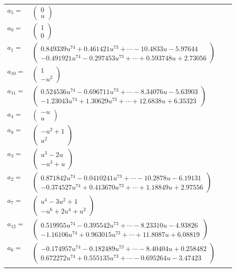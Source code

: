 \documentclass[1p]{elsarticle_modified}
\theoremstyle{definition}
\begin{document}
\begin{tabular}{m{7pt} m{180pt} m{7pt} m{180pt} }
\flushright $a_{5}=$&$\begin{pmatrix}0\\u\end{pmatrix}$ \\
\flushright $a_{9}=$&$\begin{pmatrix}1\\0\end{pmatrix}$ \\
\flushright $a_{1}=$&$\begin{pmatrix}0.849339 u^{74}+0.461421 u^{73}+\cdots-10.4833 u-5.97644\\-0.491921 u^{74}-0.297453 u^{73}+\cdots+0.593748 u+2.73056\end{pmatrix}$ \\
\flushright $a_{10}=$&$\begin{pmatrix}1\\- u^2\end{pmatrix}$ \\
\flushright $a_{11}=$&$\begin{pmatrix}0.524536 u^{74}-0.696711 u^{73}+\cdots-8.34076 u-5.63903\\-1.23043 u^{74}+1.30629 u^{73}+\cdots+12.6838 u+6.35323\end{pmatrix}$ \\
\flushright $a_{4}=$&$\begin{pmatrix}- u\\u\end{pmatrix}$ \\
\flushright $a_{8}=$&$\begin{pmatrix}- u^2+1\\u^2\end{pmatrix}$ \\
\flushright $a_{3}=$&$\begin{pmatrix}u^3-2 u\\- u^3+u\end{pmatrix}$ \\
\flushright $a_{2}=$&$\begin{pmatrix}0.871842 u^{74}-0.0410241 u^{73}+\cdots-10.2878 u-6.19131\\-0.374527 u^{74}+0.413670 u^{73}+\cdots+1.18849 u+2.97556\end{pmatrix}$ \\
\flushright $a_{7}=$&$\begin{pmatrix}u^4-3 u^2+1\\- u^6+2 u^4+u^2\end{pmatrix}$ \\
\flushright $a_{12}=$&$\begin{pmatrix}0.519955 u^{74}-0.395542 u^{73}+\cdots-8.23310 u-4.93826\\-1.16106 u^{74}+0.963015 u^{73}+\cdots+11.8087 u+6.08819\end{pmatrix}$ \\
\flushright $a_{6}=$&$\begin{pmatrix}-0.174957 u^{74}-0.182489 u^{73}+\cdots-8.40404 u+0.258482\\0.672272 u^{74}+0.555135 u^{73}+\cdots-0.695264 u-3.47423\end{pmatrix}$\\&\end{tabular}
\end{document}
